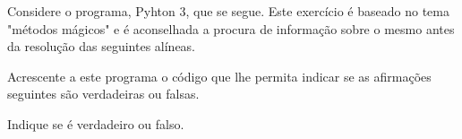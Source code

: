 \documentclass[12pt,varwidth=16cm,border=1pt]{standalone}
\begin{document}
Considere o programa, Pyhton 3, que se segue. Este exercício é baseado no tema "métodos mágicos" e é aconselhada a procura de informação sobre o mesmo antes da resolução das seguintes alíneas.



Acrescente a este programa o código que lhe permita indicar se as
afirmações seguintes são verdadeiras ou falsas.

Indique se é verdadeiro ou falso.
\end{document}
